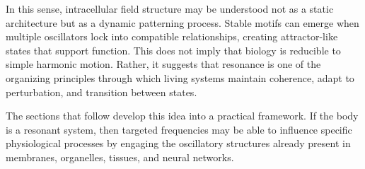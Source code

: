 In this sense, intracellular field structure may be understood not as a static architecture but as a dynamic patterning process. Stable motifs can emerge when multiple oscillators lock into compatible relationships, creating attractor-like states that support function. This does not imply that biology is reducible to simple harmonic motion. Rather, it suggests that resonance is one of the organizing principles through which living systems maintain coherence, adapt to perturbation, and transition between states.

The sections that follow develop this idea into a practical framework. If the body is a resonant system, then targeted frequencies may be able to influence specific physiological processes by engaging the oscillatory structures already present in membranes, organelles, tissues, and neural networks.

